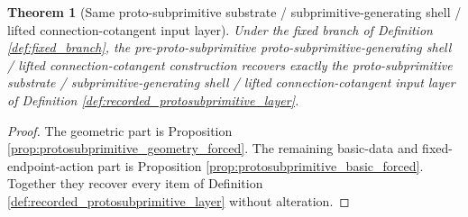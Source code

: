 \documentclass[11pt]{article}
\newtheorem{theorem}{Theorem}
\begin{document}
\begin{theorem}[Same proto-subprimitive substrate / subprimitive-generating shell / lifted connection-cotangent input layer]
\label{thm:same_protosubprimitive_input}
Under the fixed branch of Definition \ref{def:fixed_branch}, the pre-proto-subprimitive proto-subprimitive-generating shell / lifted connection-cotangent construction recovers exactly the proto-subprimitive substrate / subprimitive-generating shell / lifted connection-cotangent input layer of Definition \ref{def:recorded_protosubprimitive_layer}.
\end{theorem}

\begin{proof}
The geometric part is Proposition \ref{prop:protosubprimitive_geometry_forced}. The remaining basic-data and fixed-endpoint-action part is Proposition \ref{prop:protosubprimitive_basic_forced}. Together they recover every item of Definition \ref{def:recorded_protosubprimitive_layer} without alteration.
\end{proof}
\end{document}
